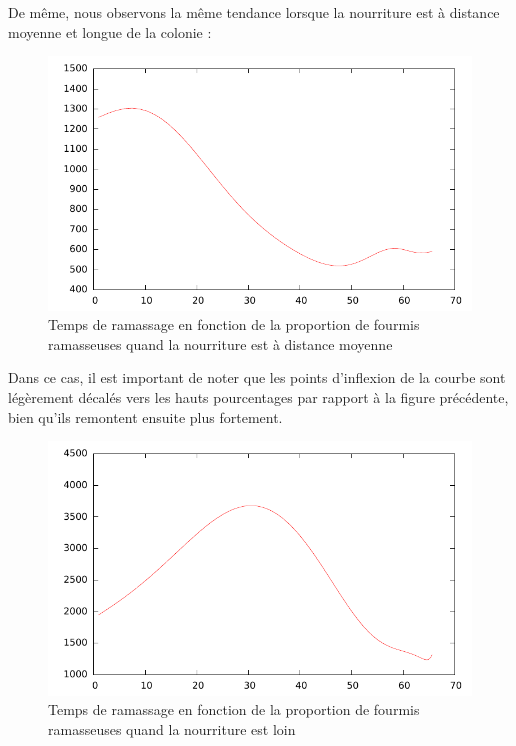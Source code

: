 \documentclass{article}
\begin{document}
De même, nous observons la même tendance lorsque la nourriture est à distance moyenne et longue de la colonie :

\begin{figure}[H]
\centering
\includegraphics[scale=0.6]{contenu/middle.pdf}
\caption{Temps de ramassage en fonction de la proportion de fourmis ramasseuses quand la nourriture est à distance moyenne}
\label{fig:moyen}
\end{figure}

Dans ce cas, il est important de noter que les points d'inflexion de la courbe sont légèrement décalés vers les hauts pourcentages par rapport à la figure précédente, bien qu'ils remontent ensuite plus fortement.

\begin{figure}[H]
\centering
\includegraphics[scale=0.6]{contenu/far.pdf}
\caption{Temps de ramassage en fonction de la proportion de fourmis ramasseuses quand la nourriture est loin}
\label{fig:loin}
\end{figure}
\end{document}
